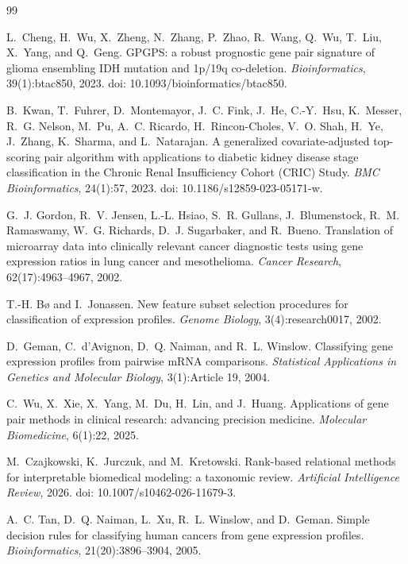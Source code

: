 \documentclass[preprint,12pt,a4paper]{elsarticle}
\begin{document}
\begin{thebibliography}{99}

L.~Cheng, H.~Wu, X.~Zheng, N.~Zhang, P.~Zhao, R.~Wang,
Q.~Wu, T.~Liu, X.~Yang, and Q.~Geng.
\newblock GPGPS: a robust prognostic gene pair signature of glioma ensembling
IDH mutation and 1p/19q co-deletion.
\newblock \emph{Bioinformatics}, 39(1):btac850, 2023.
\newblock doi: 10.1093/bioinformatics/btac850.

B.~Kwan, T.~Fuhrer, D.~Montemayor, J.~C. Fink, J.~He,
C.-Y.~Hsu, K.~Messer, R.~G. Nelson, M.~Pu, A.~C. Ricardo,
H.~Rincon-Choles, V.~O. Shah, H.~Ye, J.~Zhang, K.~Sharma,
and L.~Natarajan.
\newblock A generalized covariate-adjusted top-scoring pair algorithm with
applications to diabetic kidney disease stage classification in the Chronic
Renal Insufficiency Cohort (CRIC) Study.
\newblock \emph{BMC Bioinformatics}, 24(1):57, 2023.
\newblock doi: 10.1186/s12859-023-05171-w.

G.~J. Gordon, R.~V. Jensen, L.-L. Hsiao, S.~R. Gullans, J.~Blumenstock, R.~M. Ramaswamy, W.~G. Richards, D.~J. Sugarbaker, and R.~Bueno.
\newblock Translation of microarray data into clinically relevant cancer diagnostic tests using gene expression ratios in lung cancer and mesothelioma.
\newblock \emph{Cancer Research}, 62(17):4963--4967, 2002.

T.-H. B{\o} and I.~Jonassen.
\newblock New feature subset selection procedures for classification of expression profiles.
\newblock \emph{Genome Biology}, 3(4):research0017, 2002.

D.~Geman, C.~d'Avignon, D.~Q. Naiman, and R.~L. Winslow.
\newblock Classifying gene expression profiles from pairwise mRNA comparisons.
\newblock \emph{Statistical Applications in Genetics and Molecular Biology}, 3(1):Article 19, 2004.

C.~Wu, X.~Xie, X.~Yang, M.~Du, H.~Lin, and J.~Huang.
\newblock Applications of gene pair methods in clinical research: advancing precision medicine.
\newblock \emph{Molecular Biomedicine}, 6(1):22, 2025.

M.~Czajkowski, K.~Jurczuk, and M.~Kretowski.
\newblock Rank-based relational methods for interpretable biomedical modeling: a taxonomic review.
\newblock \emph{Artificial Intelligence Review}, 2026.
\newblock doi: 10.1007/s10462-026-11679-3.

A.~C. Tan, D.~Q. Naiman, L.~Xu, R.~L. Winslow, and D.~Geman.
\newblock Simple decision rules for classifying human cancers from gene expression profiles.
\newblock \emph{Bioinformatics}, 21(20):3896--3904, 2005.


\end{thebibliography}
\end{document}
